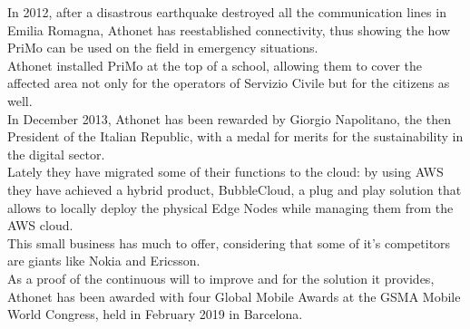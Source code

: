 	In 2012, after a disastrous earthquake destroyed all the communication lines in Emilia Romagna, Athonet has reestablished connectivity, thus showing the how PriMo can be used on the field in emergency situations.\\
	Athonet installed PriMo at the top of a school, allowing them to cover the affected area not only for the operators of Servizio Civile but for the citizens as well.\\
	In December 2013, Athonet has been rewarded by Giorgio Napolitano, the then President of the Italian Republic, with a medal for merits for the sustainability in the digital sector\cite{athonet_presidente}.\\
	Lately they have migrated some of their functions to the cloud: by using AWS they have achieved a hybrid product, BubbleCloud, a plug and play solution that allows to locally deploy the physical Edge Nodes while managing them from the AWS cloud.\\
	This small business has much to offer, considering that some of it's competitors are giants like Nokia and Ericsson.\\
	As a proof of the continuous will to improve and for the solution it provides, Athonet has been awarded with four Global Mobile Awards at the GSMA Mobile World Congress, held in February 2019 in Barcelona\cite{athonet_premi}.

